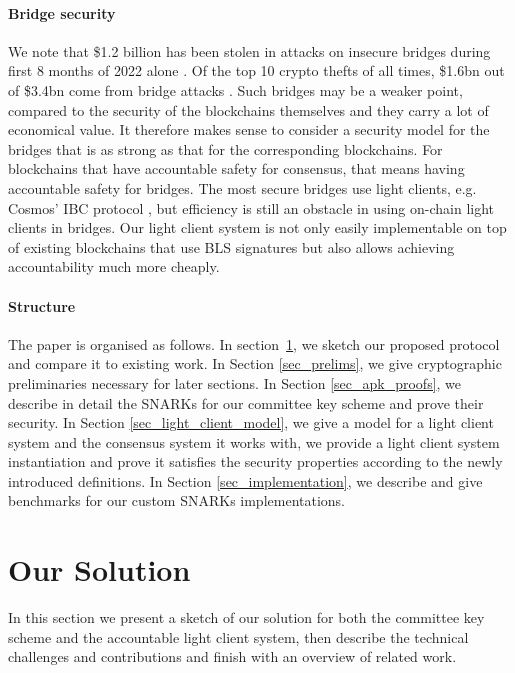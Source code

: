 \paragraph{Bridge security} We note that \$1.2 billion has been stolen in attacks on insecure bridges during first 8 months of 2022 alone \cite{elliptic_harmony,elliptic_nomad}. 
Of the top 10 crypto thefts of all times, \$1.6bn out of \$3.4bn come from bridge attacks \cite{elliptic_nomad}. Such bridges may be a weaker point, 
compared to the security of the blockchains themselves and they carry a lot of economical value. It therefore makes sense to consider a security model for the 
bridges that is as strong as that for the corresponding blockchains. For blockchains that have accountable safety for consensus, that means having accountable safety for bridges. The most secure bridges use light clients, e.g. Cosmos' IBC protocol \cite{IBC_paper}, but efficiency is still an 
obstacle in using on-chain light clients in bridges. Our light client system is not only easily implementable on top of existing blockchains that use BLS 
signatures but also allows achieving accountability much more cheaply. 

\paragraph{Structure} The paper is organised as follows. In section~\ref{sec:sketch}, we sketch our proposed protocol and compare it to existing work. In Section \ref{sec_prelims}, we give 
cryptographic preliminaries necessary for later sections. In Section \ref{sec_apk_proofs}, we describe in detail the SNARKs for our committee key scheme and prove 
their security. In Section \ref{sec_light_client_model}, we give a model for a light client system and the consensus system it works with, we provide a light client system 
instantiation and prove it satisfies the security properties according to the newly introduced definitions. In Section \ref{sec_implementation}, we describe and give benchmarks 
for our custom SNARKs implementations.

\section{Our Solution} 
\label{sec:sketch}

In this section we present a sketch of our solution for both the committee key scheme and the accountable light client system, 
then describe the technical challenges and contributions and finish with an overview of related work.

